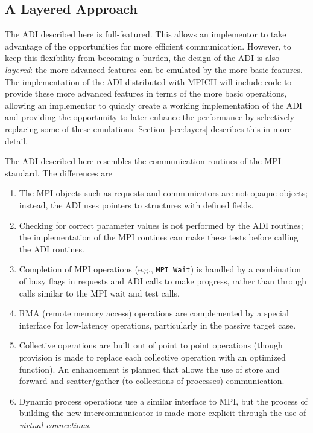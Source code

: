 \documentclass{article}
\def\code#1{\texttt{#1}}
\begin{document}
\subsection{A Layered Approach}
The ADI described here is full-featured.  This allows an implementor
to take advantage of the opportunities for more efficient
communication.  However, to keep this flexibility from becoming a
burden, the design of the ADI is also \emph{layered}: the more
advanced features can be emulated by the more basic features.  The
implementation of the ADI distributed with MPICH will include code to
provide these more advanced features in terms of the more basic
operations, allowing an implementor to quickly create a working
implementation of the ADI and providing the opportunity to later
enhance the performance by selectively replacing some of these
emulations.  Section~\ref{sec:layers} describes this in more detail.

The ADI described here resembles the communication routines of the MPI
standard.  The differences are
\begin{enumerate}
\item The MPI objects such as requests and communicators are not
opaque objects; instead, the ADI uses pointers to structures with
defined fields.

\item Checking for correct parameter values is not performed by the
ADI routines; the implementation of the MPI routines can make these
tests before calling the ADI routines.

\item Completion of MPI operations (e.g., \code{MPI\_Wait}) is handled
by a combination of busy flags in requests and ADI calls to make
progress, rather than through calls similar to the MPI wait and test
calls. 

\item RMA (remote memory access) operations are complemented by a
special interface for low-latency operations, particularly in the
passive target case.

\item Collective operations are built out of point to point operations
(though provision is made to replace each collective operation with an
optimized function).  An enhancement is planned that allows the use of
store and forward and scatter/gather (to collections of processes)
communication.  

\item Dynamic process operations use a similar interface to MPI, but the
process of building the new intercommunicator is made more explicit
through the use of \emph{virtual connections}.
\end{enumerate}
\end{document}
